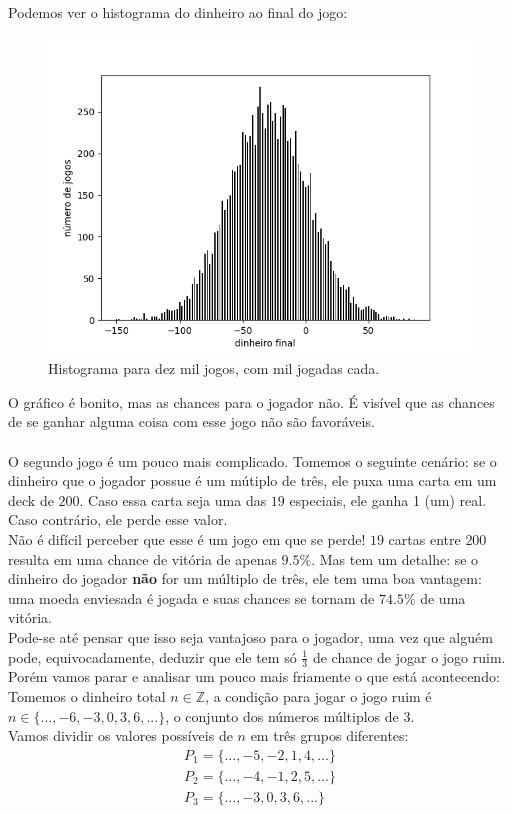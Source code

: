 \documentclass[12pt]{article}
\begin{document}
Podemos ver o histograma do dinheiro ao final do jogo:

\begin{figure}[H]
\centering
\includegraphics[scale=0.8]{graph5.png}
\caption{Histograma para dez mil jogos, com mil jogadas cada.}
\end{figure}

O gráfico é bonito, mas as chances para o jogador não. É visível que as chances de se ganhar alguma coisa com esse jogo não são favoráveis.\\
\\
O segundo jogo é um pouco mais complicado. Tomemos o seguinte cenário: se o dinheiro que o jogador possue é um mútiplo de três, ele puxa uma carta em um deck de $200$. Caso essa carta seja uma das $19$ especiais, ele ganha 1 (um) real. Caso contrário, ele perde esse valor.\\
Não é difícil perceber que esse é um jogo em que se perde! $19$ cartas entre $200$ resulta em uma chance de vitória de apenas $9.5\%$. Mas tem um detalhe: se o dinheiro do jogador \textbf{não} for um múltiplo de três, ele tem uma boa vantagem: uma moeda enviesada é jogada e suas chances se tornam de $74.5\%$ de uma vitória.\\
Pode-se até pensar que isso seja vantajoso para o jogador, uma vez que alguém pode, equivocadamente, deduzir que ele tem só $\frac{1}{3}$ de chance de jogar o jogo ruim.
\\
Porém vamos parar e analisar um pouco mais friamente o que está acontecendo:\\
Tomemos o dinheiro total $n \in \mathbb{Z}$, a condição para jogar o jogo ruim é $n \in \{..., -6, -3, 0, 3, 6, ...\}$, o conjunto dos números múltiplos de 3.\\
Vamos dividir os valores possíveis de $n$ em três grupos diferentes: 
\begin{align*}
P_{1} = \{..., -5, -2, 1, 4, ...\}\\
P_{2} =  \{..., -4, -1, 2, 5, ...\}\\
P_{3} = \{..., -3, 0, 3, 6, ...\}
\end{align*}
\end{document}
